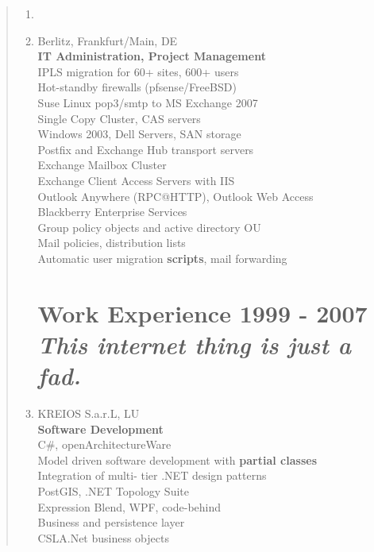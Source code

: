 \documentclass[a4paper]{report}
\begin{document}
\begin{quote}
\begin{enumerate}
\item[ ]

\item[2007 - 2008]  Berlitz, Frankfurt/Main, DE\\
                    \textbf{IT Administration, Project Management}\\
                    IPLS migration for 60+ sites, 600+ users\\
                    Hot-standby firewalls (pfsense/FreeBSD)\\
                    Suse Linux pop3/smtp to MS Exchange 2007\\
                    Single Copy Cluster, CAS servers\\
                    Windows 2003, Dell Servers, SAN storage\\
                    Postfix and Exchange Hub transport servers\\
                    Exchange Mailbox Cluster\\
                    Exchange Client Access Servers with IIS\\
                    Outlook Anywhere (RPC@HTTP), Outlook Web Access\\
                    Blackberry Enterprise Services\\
                    Group policy objects and active directory OU\\
                    Mail policies, distribution lists\\
                    Automatic user migration \textbf{scripts}, mail forwarding

\clearpage

\begin{flushleft}
  \section*{Work Experience 1999 - 2007 \\ \textit{This internet thing is just a fad.}}
\end{flushleft}

\item[2007]         KREIOS S.a.r.L, LU\\
                    \textbf{Software Development}\\
                    C\#, openArchitectureWare\\
                    Model driven software development with \textbf{partial classes}\\
                    Integration of multi- tier .NET design patterns\\
                    PostGIS, .NET Topology Suite\\
                    Expression Blend, WPF, code-behind\\
                    Business and persistence layer\\
                    CSLA.Net business objects


\end{enumerate}
\end{quote}
\end{document}
